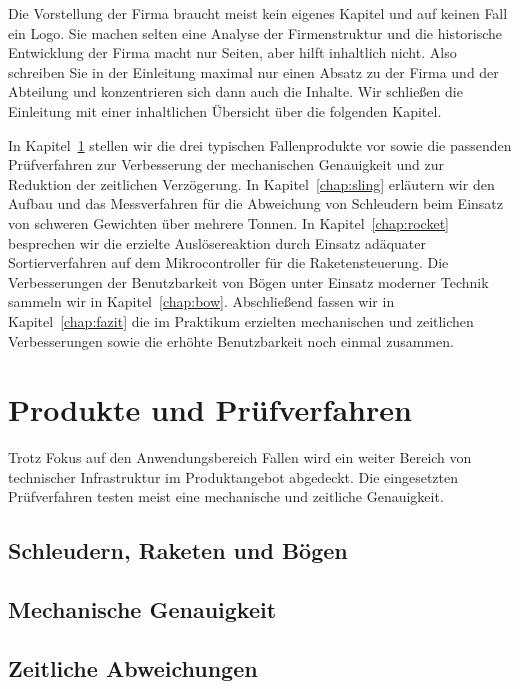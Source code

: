 \documentclass[11pt,a4paper]{report}
\begin{document}
Die Vorstellung der Firma
braucht meist kein eigenes Kapitel und auf keinen Fall ein Logo.
Sie machen selten eine Analyse der Firmenstruktur und die
historische Entwicklung der Firma macht nur Seiten, aber hilft
inhaltlich nicht.
Also schreiben Sie in der Einleitung maximal nur einen Absatz
zu der Firma und der Abteilung und konzentrieren sich dann auch
die Inhalte.
Wir schließen die Einleitung mit einer inhaltlichen Übersicht
über die folgenden Kapitel.

In Kapitel~\ref{chap:ppv} stellen wir die drei typischen Fallenprodukte
vor sowie die passenden Prüfverfahren zur Verbesserung der
mechanischen Genauigkeit und zur Reduktion der zeitlichen Verzögerung.
In Kapitel~\ref{chap:sling} erläutern wir den Aufbau und das Messverfahren
für die Abweichung von Schleudern beim Einsatz von schweren Gewichten
über mehrere Tonnen.
In Kapitel~\ref{chap:rocket} besprechen wir die erzielte Auslösereaktion
durch Einsatz adäquater Sortierverfahren auf dem Mikrocontroller für die
Raketensteuerung.
Die Verbesserungen der Benutzbarkeit von Bögen unter Einsatz moderner Technik
sammeln wir in Kapitel~\ref{chap:bow}.
Abschließend fassen wir in Kapitel~\ref{chap:fazit} die im Praktikum
erzielten mechanischen und zeitlichen Verbesserungen sowie die
erhöhte Benutzbarkeit noch einmal zusammen.


\chapter{Produkte und Prüfverfahren} \label{chap:ppv}

Trotz Fokus auf den Anwendungsbereich Fallen wird ein weiter Bereich
von technischer Infrastruktur im Produktangebot abgedeckt.
Die eingesetzten Prüfverfahren testen meist eine mechanische
und zeitliche Genauigkeit.

\section{Schleudern, Raketen und Bögen} \label{sec:was}

\blindtext[2]
\blindtext[2]

\section{Mechanische Genauigkeit} \label{sec:mec}

\blindtext[2]
\blindtext[1]
\blindtext[2]

\section{Zeitliche Abweichungen} \label{sec:time}
\end{document}
